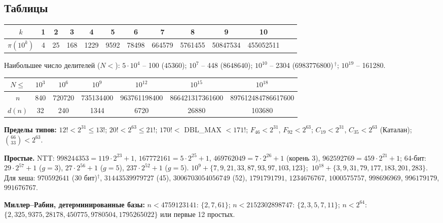 \subsection{Таблицы}
\begin{center}\footnotesize\setlength{\tabcolsep}{2.5pt}
\begin{tabular}{c|cccccccccccc}
$k$&1&2&3&4&5&6&7&8&9&10\\\hline
$\pi(10^k)$&4&25&168&1229&9592&78498&664579&5761455&50847534&455052511\\
\end{tabular}\end{center}
\par Наибольшее число делителей ($N<$): $5\cdot10^4$ -- 100 ($45360$); $10^7$ -- 448 ($8648640$); $10^{10}$ -- 2304 ($6983776800$)\,$^\dagger$; $10^{19}$ -- 161280.
\begin{center}\footnotesize\setlength{\tabcolsep}{2.5pt}
\begin{tabular}{c|cccccc}
$N\le$&$10^3$&$10^6$&$10^9$&$10^{12}$&$10^{15}$&$10^{18}$\\\hline
$n$&840&720720&735134400&963761198400&866421317361600&897612484786617600\\
$d(n)$&32&240&1344&6720&26880&103680\\
\end{tabular}\end{center}
\par \textbf{Пределы типов:} $12!<2^{31}\le13!$; $20!<2^{63}\le21!$; $170!<$ DBL\_MAX $<171!$; $F_{46}<2^{31}$, $F_{92}<2^{63}$; $C_{19}<2^{31}$, $C_{35}<2^{63}$ (Каталан); $\binom{66}{33}<2^{63}$.
\par \textbf{Простые.} NTT: $998244353=119\cdot2^{23}{+}1$, $167772161=5\cdot2^{25}{+}1$, $469762049=7\cdot2^{26}{+}1$ (корень 3), $962592769=459\cdot2^{21}{+}1$; 64-бит: $29\cdot2^{57}{+}1$ ($g{=}3$), $27\cdot2^{56}{+}1$ ($g{=}5$), $237\cdot2^{52}{+}1$ ($g{=}5$).
$10^9{+}\{7,9,21,33,87,93,97,103,123\}$;\ $10^{18}{+}\{3,9,31,79,177,183,201,283\}$. Для хеша: $970592641$ (30 бит)$^\dagger$, $31443539979727$ (45), $3006703054056749$ (52), $1791791791$, $1234676767$, $1000575757$, $998696969$, $996179179$, $991676767$.
\par \textbf{Миллер--Рабин, детерминированные базы:} $n<4759123141$: $\{2,7,61\}$; $n<2152302898747$: $\{2,3,5,7,11\}$; $n<2^{64}$: $\{2,325,9375,28178,450775,9780504,1795265022\}$ или первые 12 простых.
